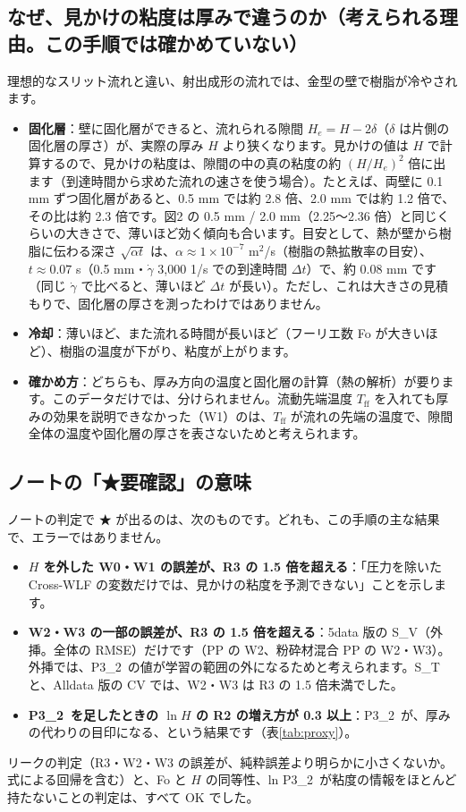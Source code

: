 \documentclass[paper=a4paper,fontsize=10.5pt,line_length=44zw,number_of_lines=38]{jlreq}
\newcommand{\gd}{\dot{\gamma}}
\newcommand{\Tff}{T_{\mathrm{ff}}}
\newcommand{\PII}{P3\_2}
\newenvironment{points}{\begin{itemize}[label=$\triangleright$,leftmargin=1.5\zw,itemsep=0.3ex,topsep=0.5ex,parsep=0pt]}{\end{itemize}}
\newcommand{\pt}[1]{\item \textbf{#1}：}
\begin{document}
\subsection{なぜ、見かけの粘度は厚みで違うのか（考えられる理由。この手順では確かめていない）}
理想的なスリット流れと違い、射出成形の流れでは、金型の壁で樹脂が冷やされます。
\begin{points}
\pt{固化層}壁に固化層ができると、流れられる隙間 $H_e = H - 2\delta$（$\delta$ は片側の固化層の厚さ）が、実際の厚み $H$ より狭くなります。見かけの値は $H$ で計算するので、見かけの粘度は、隙間の中の真の粘度の約 $(H/H_e)^2$ 倍に出ます（到達時間から求めた流れの速さを使う場合）。たとえば、両壁に 0.1 mm ずつ固化層があると、0.5 mm では約 2.8 倍、2.0 mm では約 1.2 倍で、その比は約 2.3 倍です。図2 の 0.5 mm / 2.0 mm（2.25〜2.36 倍）と同じくらいの大きさで、薄いほど効く傾向も合います。目安として、熱が壁から樹脂に伝わる深さ $\sqrt{\alpha t}$ は、$\alpha \approx 1\times10^{-7}$ m$^2$/s（樹脂の熱拡散率の目安）、$t \approx 0.07$ s（0.5 mm・$\gd$ 3,000 1/s での到達時間 $\Delta t$）で、約 0.08 mm です（同じ $\gd$ で比べると、薄いほど $\Delta t$ が長い）。ただし、これは大きさの見積もりで、固化層の厚さを測ったわけではありません。
\pt{冷却}薄いほど、また流れる時間が長いほど（フーリエ数 Fo が大きいほど）、樹脂の温度が下がり、粘度が上がります。
\pt{確かめ方}どちらも、厚み方向の温度と固化層の計算（熱の解析）が要ります。このデータだけでは、分けられません。流動先端温度 $\Tff$ を入れても厚みの効果を説明できなかった（W1）のは、$\Tff$ が流れの先端の温度で、隙間全体の温度や固化層の厚さを表さないためと考えられます。
\end{points}

\subsection{ノートの「★要確認」の意味}
ノートの判定で ★ が出るのは、次のものです。どれも、この手順の主な結果で、エラーではありません。
\begin{points}
\pt{$H$ を外した W0・W1 の誤差が、R3 の 1.5 倍を超える}「圧力を除いた Cross-WLF の変数だけでは、見かけの粘度を予測できない」ことを示します。
\pt{W2・W3 の一部の誤差が、R3 の 1.5 倍を超える}5data 版の S\_V（外挿。全体の RMSE）だけです（PP の W2、粉砕材混合 PP の W2・W3）。外挿では、\PII\ の値が学習の範囲の外になるためと考えられます。S\_T と、Alldata 版の CV では、W2・W3 は R3 の 1.5 倍未満でした。
\pt{\PII\ を足したときの $\ln H$ の R2 の増え方が 0.3 以上}\PII\ が、厚みの代わりの目印になる、という結果です（表\ref{tab:proxy}）。
\end{points}
リークの判定（R3・W2・W3 の誤差が、純粋誤差より明らかに小さくないか。式による回帰を含む）と、Fo と $H$ の同等性、ln \PII\ が粘度の情報をほとんど持たないことの判定は、すべて OK でした。
\end{document}
